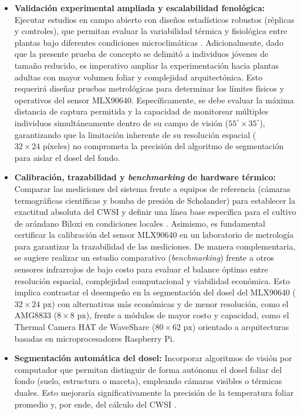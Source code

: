 \begin{itemize}
    \item \textbf{Validación experimental ampliada y escalabilidad fenológica:}  
    Ejecutar estudios en campo abierto con diseños estadísticos robustos (réplicas y controles), que permitan evaluar la variabilidad térmica y fisiológica entre plantas bajo diferentes condiciones microclimáticas . Adicionalmente, dado que la presente prueba de concepto se delimitó a individuos jóvenes de tamaño reducido, es imperativo ampliar la experimentación hacia plantas adultas con mayor volumen foliar y complejidad arquitectónica. Esto requerirá diseñar pruebas metrológicas para determinar los límites físicos y operativos del sensor MLX90640. Específicamente, se debe evaluar la máxima distancia de captura permitida y la capacidad de monitorear múltiples individuos simultáneamente dentro de su campo de visión ($55^\circ \times 35^\circ$), garantizando que la limitación inherente de su resolución espacial ($32 \times 24\text{ píxeles}$) no comprometa la precisión del algoritmo de segmentación para aislar el dosel del fondo.

    \item \textbf{Calibración, trazabilidad y \textit{benchmarking} de hardware térmico:}  
    Comparar las mediciones del sistema frente a equipos de referencia (cámaras termográficas científicas y bomba de presión de Scholander) para establecer la exactitud absoluta del CWSI y definir una línea base específica para el cultivo de arándano Biloxi en condiciones locales . Asimismo, es fundamental certificar la calibración del sensor MLX90640 en un laboratorio de metrología para garantizar la trazabilidad de las mediciones. De manera complementaria, se sugiere realizar un estudio comparativo (\textit{benchmarking}) frente a otros sensores infrarrojos de bajo costo para evaluar el balance óptimo entre resolución espacial, complejidad computacional y viabilidad económica. Esto implica contrastar el desempeño en la segmentación del dosel del MLX90640 ($32 \times 24\text{ px}$) con alternativas más económicas y de menor resolución, como el AMG8833 ($8 \times 8\text{ px}$), frente a módulos de mayor costo y capacidad, como el Thermal Camera HAT de WaveShare ($80 \times 62\text{ px}$) orientado a arquitecturas basadas en microprocesadores Raspberry Pi.

    \item \textbf{Segmentación automática del dosel:}  
    Incorporar algoritmos de visión por computador que permitan distinguir de forma autónoma el dosel foliar del fondo (suelo, estructura o maceta), empleando cámaras visibles o térmicas duales. Esto mejoraría significativamente la precisión de la temperatura foliar promedio y, por ende, del cálculo del CWSI .


\end{itemize}
